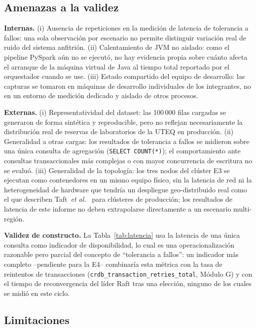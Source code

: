 \documentclass[10pt,twocolumn]{article}
\begin{document}
\subsection{Amenazas a la validez}

\textbf{Internas.} (i) Ausencia de repeticiones en la medición de latencia
de tolerancia a fallos: una sola observación por escenario no permite
distinguir variación real de ruido del sistema anfitrión. (ii) Calentamiento
de JVM no aislado: como el pipeline PySpark aún no se ejecutó, no hay
evidencia propia sobre cuánto afecta el arranque de la máquina virtual de
Java al tiempo total reportado por el orquestador cuando se use. (iii)
Estado compartido del equipo de desarrollo: las capturas se tomaron en
máquinas de desarrollo individuales de los integrantes, no en un entorno de
medición dedicado y aislado de otros procesos.

\textbf{Externas.} (i) Representatividad del dataset: las 100\,000 filas
cargadas se generaron de forma sintética y reproducible, pero no reflejan
necesariamente la distribución real de reservas de laboratorios de la UTEQ
en producción. (ii) Generalidad a otras cargas: los resultados de
tolerancia a fallos se midieron sobre una única consulta de agregación
(\texttt{SELECT COUNT(*)}); el comportamiento ante consultas transaccionales
más complejas o con mayor concurrencia de escritura no se evaluó. (iii)
Generalidad de la topología: los tres nodos del clúster E3 se ejecutan como
contenedores en un mismo equipo físico, sin la latencia de red ni la
heterogeneidad de hardware que tendría un despliegue geo-distribuido real
como el que describen Taft~\emph{et al.}~\cite{taft2020} para clústeres de
producción; los resultados de latencia de este informe no deben
extrapolarse directamente a un escenario multi-región.

\textbf{Validez de constructo.} La Tabla~\ref{tab:latencia} usa la
latencia de una única consulta como indicador de disponibilidad, lo cual es
una operacionalización razonable pero parcial del concepto de
``tolerancia a fallos'': un indicador más completo --pendiente para la E4--
combinaría esta métrica con la tasa de reintentos de transacciones
(\texttt{crdb\_transaction\_retries\_total}, Módulo G) y con el tiempo de
reconvergencia del líder Raft tras una elección, ninguno de los cuales se
midió en este ciclo.

\subsection{Limitaciones}
\end{document}

